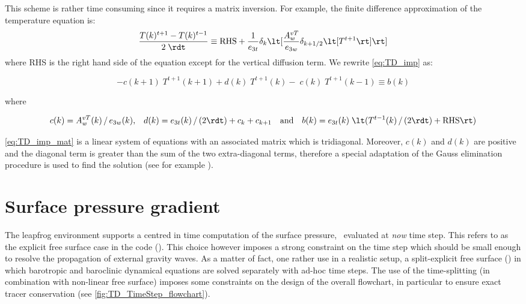 \documentclass[../main/NEMO_manual]{subfiles}
\begin{document}
This scheme is rather time consuming since it requires a matrix inversion.
For example, the finite difference approximation of the temperature equation is:
\[
  \frac{T(k)^{t + 1} - T(k)^{t - 1}}{2 \; \rdt}
  \equiv
  \text{RHS} + \frac{1}{e_{3t}} \delta_k \lt[ \frac{A_w^{vT}}{e_{3w} } \delta_{k + 1/2} \lt[ T^{t + 1} \rt] \rt]
\]
where RHS is the right hand side of the equation except for the vertical diffusion term.
We rewrite \autoref{eq:TD_imp} as:

\begin{equation}
  \label{eq:TD_imp_mat}
  -c(k + 1) \; T^{t + 1}(k + 1) + d(k) \; T^{t + 1}(k) - \; c(k) \; T^{t + 1}(k - 1) \equiv b(k)
\end{equation}

where

\[
  c(k) = A_w^{vT} (k) \, / \, e_{3w} (k) \text{,} \quad
  d(k) = e_{3t}   (k)       \, / \, (2 \rdt) + c_k + c_{k + 1} \quad \text{and} \quad
  b(k) = e_{3t}   (k) \; \lt( T^{t - 1}(k) \, / \, (2 \rdt) + \text{RHS} \rt)
\]

\autoref{eq:TD_imp_mat} is a linear system of equations with
an associated matrix which is tridiagonal.
Moreover, $c(k)$ and $d(k)$ are positive and
the diagonal term is greater than the sum of the two extra-diagonal terms,
therefore a special adaptation of the Gauss elimination procedure is used to find the solution
(see for example \citet{richtmyer.morton_bk67}).

\section{Surface pressure gradient}
\label{sec:TD_spg_ts}

The leapfrog environment supports a centred in time computation of the surface pressure,
\ie\ evaluated at \textit{now} time step.
This refers to as the explicit free surface case in the code
().
This choice however imposes a strong constraint on the time step which
should be small enough to resolve the propagation of external gravity waves.
As a matter of fact, one rather use in a realistic setup,
a split-explicit free surface () in which
barotropic and baroclinic dynamical equations are solved separately with ad-hoc time steps.
The use of the time-splitting (in combination with non-linear free surface) imposes
some constraints on the design of the overall flowchart,
in particular to ensure exact tracer conservation (see \autoref{fig:TD_TimeStep_flowchart}).
\end{document}
